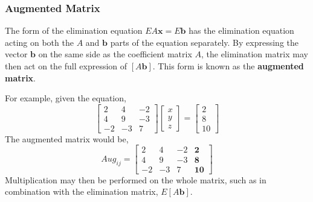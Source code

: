         \subsubsection{Augmented Matrix}
            The form of the elimination equation \(EA\boldsymbol{x}=E\boldsymbol{b}\) has the elimination equation 
            acting on both the \(A\) and \(\boldsymbol{b}\) parts of the equation separately. By expressing the vector
            \(\boldsymbol{b}\) on the same side as the coefficient matrix \(A\), the elimination matrix may then act on the
            full expression of \([A \boldsymbol{b}]\). This form is known as the \textbf{augmented matrix}.
            \par \hfill \break
            For example, given the equation,
            \begin{equation}
                \begin{bmatrix}
                    2 & 4 & -2 \\
                    4 & 9 & -3 \\
                    -2 & -3 & 7 
                \end{bmatrix}
                \begin{bmatrix}
                    x \\
                    y \\
                    z
                \end{bmatrix}
                =
                \begin{bmatrix}
                    2 \\
                    8 \\
                    10
                \end{bmatrix}
            \end{equation}
            The augmented matrix would be,
            \begin{equation}
                Aug_{ij} = 
                \begin{bmatrix}
                    2 & 4 & -2 & \boldsymbol{2} \\
                    4 & 9 & -3 & \boldsymbol{8} \\
                    -2 & -3 & 7 & \boldsymbol{10}
                \end{bmatrix}
            \end{equation}
            Multiplication may then be performed on the whole matrix, such as in combination with the elimination 
            matrix, \(E[A\boldsymbol{b}]\).

